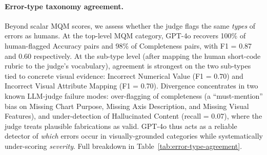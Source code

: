 \paragraph{Error-type taxonomy agreement.}
Beyond scalar MQM scores, we assess whether the judge flags the same \emph{types} of errors as humans. At the top-level MQM category, GPT-4o recovers 100\% of human-flagged Accuracy pairs and 98\% of Completeness pairs, with F1 = 0.87 and 0.60 respectively. At the sub-type level (after mapping the human short-code rubric to the judge's vocabulary), agreement is strongest on the two sub-types tied to concrete visual evidence: Incorrect Numerical Value (F1 = 0.70) and Incorrect Visual Attribute Mapping (F1 = 0.70). Divergence concentrates in two known LLM-judge failure modes: over-flagging of completeness (a ``must-mention'' bias on Missing Chart Purpose, Missing Axis Description, and Missing Visual Features), and under-detection of Hallucinated Content (recall = 0.07), where the judge treats plausible fabrications as valid. GPT-4o thus acts as a reliable detector of \emph{which} errors occur in visually-grounded categories while systematically under-scoring \emph{severity}. Full breakdown in Table~\ref{tab:error-type-agreement}.

